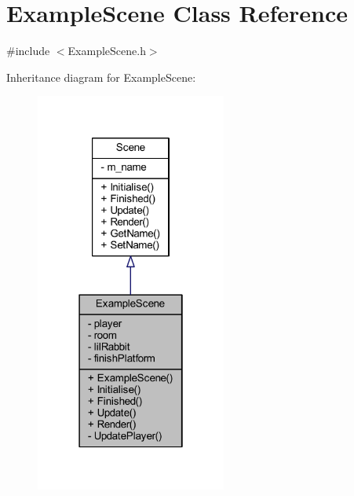 \hypertarget{class_example_scene}{}\section{Example\+Scene Class Reference}
\label{class_example_scene}


{\ttfamily \#include $<$Example\+Scene.\+h$>$}



Inheritance diagram for Example\+Scene\+:\nopagebreak
\begin{figure}[H]
\begin{center}
\leavevmode
\includegraphics[width=178pt]{class_example_scene__inherit__graph}
\end{center}
\end{figure}


